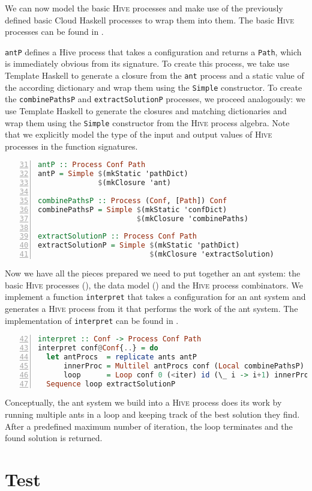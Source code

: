 We can now model the basic \textsc{Hive} processes and make use of the previously defined basic \textsf{Cloud Haskell} processes to wrap them into them. The basic \textsc{Hive} processes can be found in .

\texttt{antP} defines a \textsf{Hive} process that takes a configuration and returns a \texttt{Path}, which is immediately obvious from its signature. To create this process, we take use \textsf{Template Haskell} to generate a closure from the \texttt{ant} process and a static value of the according dictionary and wrap them using the \texttt{Simple} constructor. To create the \texttt{combinePathsP} and \texttt{extractSolutionP} processes, we proceed analogously: we use \textsf{Template Haskell} to generate the closures and matching dictionaries and wrap them using the \texttt{Simple} constructor from the \textsc{Hive} process algebra. Note that we explicitly model the type of the input and output values of \textsc{Hive} processes in the function signatures.

\begin{lstlisting}[language=Haskell,frame=tb,numbers=left,firstnumber=31,label=lst:ant_hive,caption={\textsc{Hive} processes, built on top of basic \textsf{Cloud Haskell} processes.}]
antP :: Process Conf Path
antP = Simple $(mkStatic 'pathDict)
              $(mkClosure 'ant)

combinePathsP :: Process (Conf, [Path]) Conf
combinePathsP = Simple $(mkStatic 'confDict)
                       $(mkClosure 'combinePaths)

extractSolutionP :: Process Conf Path
extractSolutionP = Simple $(mkStatic 'pathDict)
                          $(mkClosure 'extractSolution)
\end{lstlisting}

Now we have all the pieces prepared we need to put together an ant system: the basic \textsc{Hive} processes (), the data model () and the \textsc{Hive} process combinators. We implement a function \texttt{interpret} that takes a configuration for an ant system and generates a \textsc{Hive} process from it that performs the work of the ant system. The implementation of \texttt{interpret} can be found in .

\begin{lstlisting}[language=Haskell,frame=tb,numbers=left,firstnumber=42,label=lst:ant_system_complete,caption=Transformation of a configuration for an ant system into a process hierarchy.]
interpret :: Conf -> Process Conf Path
interpret conf@Conf{..} = do
  let antProcs  = replicate ants antP
      innerProc = Multilel antProcs conf (Local combinePathsP)
      loop      = Loop conf 0 (<iter) id (\_ i -> i+1) innerProc
  Sequence loop extractSolutionP
\end{lstlisting}

Conceptually, the ant system we build into a \textsc{Hive} process does its work by running multiple ants in a loop and keeping track of the best solution they find. After a predefined maximum number of iteration, the loop terminates and the found solution is returned. 

\section{Test}